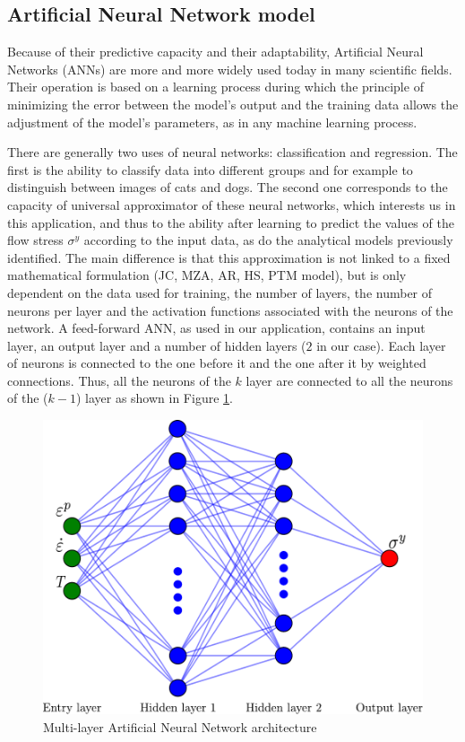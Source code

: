 \documentclass[twoside,english,1p,final,sort&compress]{elsarticle}
\theoremstyle{plain}
\begin{document}
\subsection{Artificial Neural Network model\label{sec:ANNmodel}}
Because of their predictive capacity and their adaptability, Artificial Neural Networks (ANNs) are more and more widely used today in many scientific fields.
Their operation is based on a learning process during which the principle of minimizing the error between the model's output and the training data allows the adjustment of the model's parameters, as in any machine learning process.

There are generally two uses of neural networks: classification and regression.
The first is the ability to classify data into different groups and for example to distinguish between images of cats and dogs.
The second one corresponds to the capacity of universal approximator of these neural networks, which interests us in this application, and thus to the ability after learning to predict the values of the flow stress $\sigma^y$ according to the input data, as do the analytical models previously identified.
The main difference is that this approximation is not linked to a fixed mathematical formulation (JC, MZA, AR, HS, PTM model), but is only dependent on the data used for training, the number of layers, the number of neurons per layer and the activation functions associated with the neurons of the network.
A feed-forward ANN, as used in our application, contains an input layer, an output layer and a number of hidden layers ($2$ in our case).
Each layer of neurons is connected to the one before it and the one after it by weighted connections.
Thus, all the neurons of the $k$ layer are connected to all the neurons of the ($k-1$) layer as shown in Figure \ref{fig:ANN-scheme-2HL}.
\begin{figure}[!ht]
\centering
\includegraphics[width=0.7\columnwidth]
{Figures/ANN-scheme-2HL}
\caption{Multi-layer Artificial Neural Network architecture}
\label{fig:ANN-scheme-2HL}
\end{figure}
\end{document}
